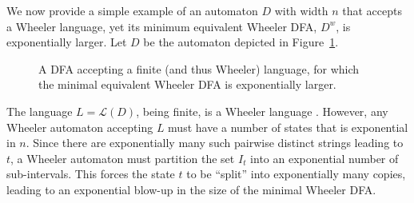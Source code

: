 \begin{example}
    We now provide a simple example of an automaton $D$ with width $n$ that accepts a Wheeler language, yet its minimum equivalent Wheeler DFA, $D^w$, is exponentially larger. Let $D$ be the automaton depicted in Figure~\ref{fig:exponential-gap-dfa}.

    \begin{figure}[H]
    \centering
    \caption{A DFA accepting a finite (and thus Wheeler) language, for which the minimal equivalent Wheeler DFA is exponentially larger.}
    \label{fig:exponential-gap-dfa}
    \end{figure}

    The language $L = \mathcal{L}(D)$, being finite, is a Wheeler language \cite{alanko2021wheeler}. However, any Wheeler automaton accepting $L$ must have a number of states that is exponential in $n$. Since there are exponentially many such pairwise distinct strings leading to $t$, a Wheeler automaton must partition the set $I_t$ into an exponential number of sub-intervals. This forces the state $t$ to be ``split'' into exponentially many copies, leading to an exponential blow-up in the size of the minimal Wheeler DFA.
\end{example}

